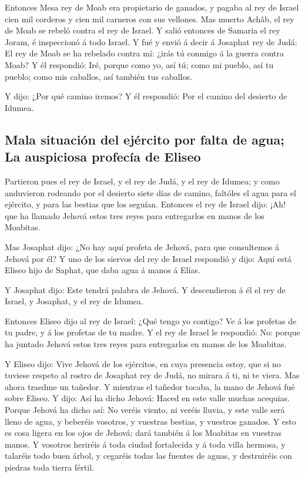  Entonces Mesa rey de Moab era propietario de ganados, y
pagaba al rey de Israel cien mil corderos y cien mil carneros con sus
vellones.  Mas muerto Achâb, el rey de Moab se rebeló
contra el rey de Israel.  Y salió entonces de Samaria el
rey Joram, é inspeccionó á todo Israel.  Y fué y envió á
decir á Josaphat rey de Judá: El rey de Moab se ha rebelado contra mí:
¿irás tú conmigo á la guerra contra Moab? Y él respondió: Iré, porque
como yo, así tú; como mi pueblo, así tu pueblo; como mis caballos, así
también tus caballos.

 Y dijo: ¿Por qué camino iremos? Y él respondió: Por el
camino del desierto de Idumea.

\hypertarget{mala-situaciuxf3n-del-ejuxe9rcito-por-falta-de-agua-la-auspiciosa-profecuxeda-de-eliseo}{%
\subsection{Mala situación del ejército por falta de agua; La auspiciosa
profecía de
Eliseo}\label{mala-situaciuxf3n-del-ejuxe9rcito-por-falta-de-agua-la-auspiciosa-profecuxeda-de-eliseo}}

 Partieron pues el rey de Israel, y el rey de Judá, y el
rey de Idumea; y como anduvieron rodeando por el desierto siete días de
camino, faltóles el agua para el ejército, y para las bestias que los
seguían.  Entonces el rey de Israel dijo: ¡Ah! que ha
llamado Jehová estos tres reyes para entregarlos en manos de los
Moabitas.

 Mas Josaphat dijo: ¿No hay aquí profeta de Jehová, para
que consultemos á Jehová por él? Y uno de los siervos del rey de Israel
respondió y dijo: Aquí está Eliseo hijo de Saphat, que daba agua á manos
á Elías.

 Y Josaphat dijo: Este tendrá palabra de Jehová. Y
descendieron á él el rey de Israel, y Josaphat, y el rey de Idumea.

 Entonces Eliseo dijo al rey de Israel: ¿Qué tengo yo
contigo? Ve á los profetas de tu padre, y á los profetas de tu madre. Y
el rey de Israel le respondió: No: porque ha juntado Jehová estos tres
reyes para entregarlos en manos de los Moabitas.

 Y Eliseo dijo: Vive Jehová de los ejércitos, en cuya
presencia estoy, que si no tuviese respeto al rostro de Josaphat rey de
Judá, no mirara á ti, ni te viera.  Mas ahora traedme un
tañedor. Y mientras el tañedor tocaba, la mano de Jehová fué sobre
Eliseo.  Y dijo: Así ha dicho Jehová: Haced en este valle
muchas acequias.  Porque Jehová ha dicho así: No veréis
viento, ni veréis lluvia, y este valle será lleno de agua, y beberéis
vosotros, y vuestras bestias, y vuestros ganados.  Y esto
es cosa ligera en los ojos de Jehová; dará también á los Moabitas en
vuestras manos.  Y vosotros heriréis á toda ciudad
fortalecida y á toda villa hermosa, y talaréis todo buen árbol, y
cegaréis todas las fuentes de aguas, y destruiréis con piedras toda
tierra fértil.


